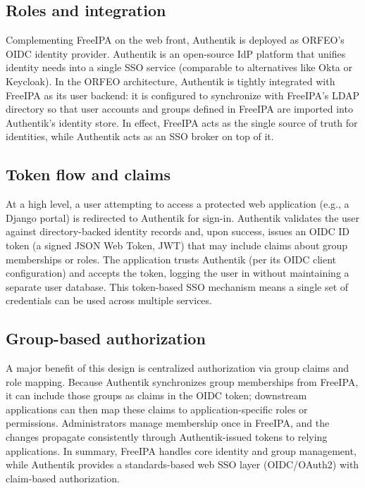 \subsection*{Roles and integration}
Complementing FreeIPA on the web front, Authentik is deployed as ORFEO’s OIDC identity provider. Authentik is an open-source IdP platform that unifies identity needs into a single SSO service (comparable to alternatives like Okta or Keycloak)\parencite{Authentik_Home}. In the ORFEO architecture, Authentik is tightly integrated with FreeIPA as its user backend: it is configured to synchronize with FreeIPA’s LDAP directory so that user accounts and groups defined in FreeIPA are imported into Authentik’s identity store\parencite{Authentik_Docs_LDAP}. In effect, FreeIPA acts as the single source of truth for identities, while Authentik acts as an SSO broker on top of it\parencite{FreeIPA_Docs}.

\subsection*{Token flow and claims}
At a high level, a user attempting to access a protected web application (e.g., a Django portal) is redirected to Authentik for sign-in. Authentik validates the user against directory-backed identity records and, upon success, issues an OIDC ID token (a signed JSON Web Token, JWT) that may include claims about group memberships or roles. The application trusts Authentik (per its OIDC client configuration) and accepts the token, logging the user in without maintaining a separate user database\parencite{Authentik_Docs_OIDC}. This token-based SSO mechanism means a single set of credentials can be used across multiple services.

\subsection*{Group-based authorization}
A major benefit of this design is centralized authorization via group claims and role mapping. Because Authentik synchronizes group memberships from FreeIPA, it can include those groups as claims in the OIDC token; downstream applications can then map these claims to application-specific roles or permissions\parencite{Authentik_Docs_Claims,Authentik_Docs_LDAP}. Administrators manage membership once in FreeIPA, and the changes propagate consistently through Authentik-issued tokens to relying applications. In summary, FreeIPA handles core identity and group management, while Authentik provides a standards-based web SSO layer (OIDC/OAuth2) with claim-based authorization\parencite{FreeIPA_Docs,Authentik_Docs_OIDC}.
